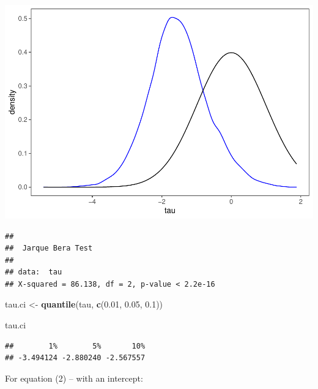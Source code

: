 \documentclass[11pt, a4paper]{report}
\newenvironment{Shaded}{\begin{snugshade}}{\end{snugshade}}
\newcommand{\CommentTok}[1]{\textcolor[rgb]{0.56,0.35,0.01}{\textit{#1}}}
\newcommand{\FloatTok}[1]{\textcolor[rgb]{0.00,0.00,0.81}{#1}}
\newcommand{\KeywordTok}[1]{\textcolor[rgb]{0.13,0.29,0.53}{\textbf{#1}}}
\newcommand{\NormalTok}[1]{#1}
\newcommand{\StringTok}[1]{\textcolor[rgb]{0.31,0.60,0.02}{#1}}
\theoremstyle{plain}
\theoremstyle{plain}
\theoremstyle{remark}
\begin{document}
\begin{center}\includegraphics{Econo2_P6_files/figure-latex/monte carlo 1-2} \end{center}

\begin{Shaded}
\end{Shaded}

\begin{verbatim}
## 
##  Jarque Bera Test
## 
## data:  tau
## X-squared = 86.138, df = 2, p-value < 2.2e-16
\end{verbatim}

\begin{Shaded}
\begin{Highlighting}[]
\NormalTok{tau.ci <-}\StringTok{ }\KeywordTok{quantile}\NormalTok{(tau, }\KeywordTok{c}\NormalTok{(}\FloatTok{0.01}\NormalTok{, }\FloatTok{0.05}\NormalTok{, }\FloatTok{0.1}\NormalTok{))}

\NormalTok{tau.ci}
\end{Highlighting}
\end{Shaded}

\begin{verbatim}
##        1%        5%       10% 
## -3.494124 -2.880240 -2.567557
\end{verbatim}

For equation (2) -- with an intercept:
\end{document}
